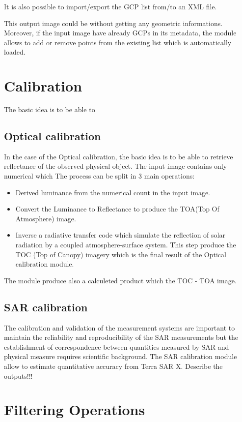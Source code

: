 \documentclass{InsightSoftwareGuide}
\begin{document}
It is also possible to import/export the GCP list from/to an XML file.

This output image could be without getting any geometric informations. Moreover, if the input image have already GCPs
in its metadata, the module allows to add or remove points from the existing list which is automatically loaded.       

\section{Calibration}
The basic idea is to be able to  
\subsection{Optical calibration}
In the case of the Optical calibration, the basic idea is to be able to retrieve reflectance of the observed physical object.
The input image contains only numerical which 
The process can be split in 3 main operations:
\begin{itemize}
\item Derived luminance from the numerical count in the input image. 
\item Convert the Luminance to Reflectance to produce the TOA(Top Of Atmosphere) image.
\item Inverse a radiative transfer code which simulate the reflection of solar radiation by a coupled atmosphere-surface system. This step produce 
the TOC (Top of Canopy) imagery which is the final result of the Optical calibration module. 
\end{itemize}
    
The module produce also a calculeted product which the TOC - TOA image.

\subsection{SAR calibration}

The calibration and validation of the measurement systems are important to maintain the
reliability and reproducibility of the SAR measurements but the establishment of correspondence between quantities measured 
by SAR and physical measure requires scientific background. The SAR calibration module allow to estimate quantitative accuracy
from Terra SAR X.
Describe the outputs!!!

\section{Filtering Operations}
\end{document}

